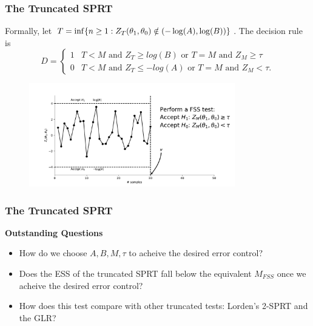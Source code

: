 \documentclass[10pt]{beamer}
\begin{document}
\begin{frame}
\frametitle{The Truncated SPRT}

Formally, let $T = \inf\{n \geq 1 : Z_{T}(\theta_1, \theta_0) \notin (-\log(A), \log(B)) \}$. The decision rule is
\[
D =
\begin{cases}
1  & T < M \text{ and } Z_T \geq log(B) \text{ or } T = M \text{ and } Z_M \geq \tau \\
0  & T < M \text{ and } Z_T \leq -log(A) \text{ or } T = M \text{ and } Z_M < \tau .
\end{cases}
\]

\begin{figure}
\centering
\includegraphics[height=0.5\textheight, width=0.8\textwidth]{images/truncated_sprt}
\end{figure}
\end{frame}


\begin{frame}
\frametitle{The Truncated SPRT}
\textbf{Outstanding Questions}

\begin{itemize}
\item How do we choose $A, B, M, \tau$ to acheive the desired error control?
\item Does the ESS of the truncated SPRT fall below the equivalent $M_{FSS}$ once we acheive the desired error control?
\item How does this test compare with other truncated tests: Lorden's 2-SPRT and the GLR?
\end{itemize}

\end{frame}
\end{document}
